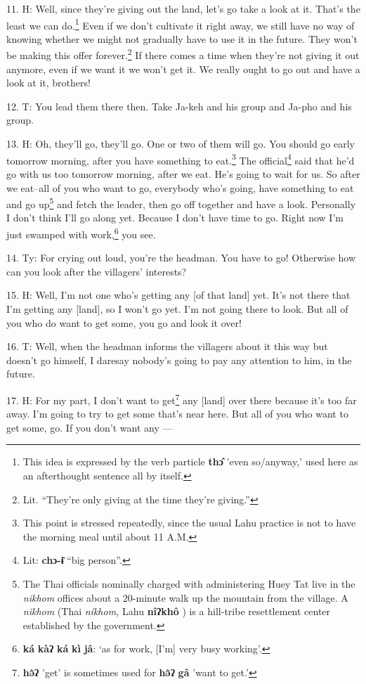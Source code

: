 11. H: Well, since they're giving out the land, let's go take a look at it. That's
the least we can do.\footnote{This idea is expressed by the verb particle \textbf{thɔ̂} 'even so/anyway,' used here as an afterthought sentence all by itself.} Even if we don't cultivate it right away, we still have
no way of knowing whether we might not gradually have to use it in the future.
They won't be making this offer forever.\footnote{Lit. ``They're only giving at the time they're giving.''} If there comes a time when they're
not giving it out anymore, even if we want it we won't get it. We really ought
to go out and have a look at it, brothers!

12. T: You lead them there then. Take Ja-keh and his group and Ja-pho and his
group.

13. H: Oh, they'll go, they'll go. One or two of them will go. You should go early
tomorrow morning, after you have something to eat.\footnote{This point is stressed repeatedly, since the usual Lahu practice is not to have the morning meal until about 11 A.M.} The official\footnote{Lit: \textbf{chɔ-ɨ̄} ``big person''.} said that
he'd go with us too tomorrow morning, after we eat. He's going to wait for us.
So after we eat--all of you who want to go, everybody who's going, have something
to eat and go up\footnote{The Thai officials nominally charged with administering Huey Tat live in the \textit{nikhom } offices about a 20-minute walk up the mountain from the village. A \textit{nikhom } (Thai \textit{níkhom, }Lahu \textbf{nîʔkhô} ) is a hill-tribe resettlement center established by the government.} and fetch the leader, then go off together and have a look.
Personally I don't think I'll go along yet. Because I don't have time to go. Right
now I'm just swamped with work,\footnote{\textbf{ká} \textbf{kàʔ} \textbf{ká} \textbf{kì} \textbf{jâ}: `as for work, [I'm] very busy working'.} you see.

14. Ty: For crying out loud, you're the headman. You have to go! Otherwise
how can you look after the villagers' interests?

15. H: Well, I'm not one who's getting any [of that land] yet. It's not there that
I'm getting any [land], so I won't go yet. I'm not going there to look. But all
of you who do want to get some, you go and look it over!

16. T: Well, when the headman informs the villagers about it this way but doesn't
go himself, I daresay nobody's going to pay any attention to him, in the future.

17. H: For my part, I don't want to get\footnote{\textbf{hə̂ʔ} 'get' is sometimes used for \textbf{hə̂ʔ} \textbf{gâ} 'want to get.'} any [land] over there because it's too
far away. I'm going to try to get some that's near here. But all of you who want
to get some, go. If you don't want any ---

